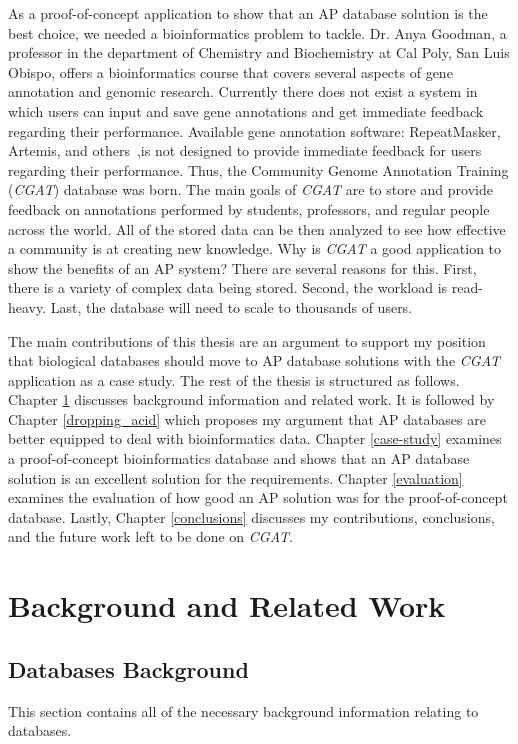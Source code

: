 \documentclass[12pt]{ucthesis}
\begin{document}
As a proof-of-concept application to show that an AP database solution is the best choice, we needed a bioinformatics problem to tackle. Dr. Anya Goodman, a professor in the department of Chemistry and Biochemistry
at Cal Poly, San Luis Obispo, offers a bioinformatics course that covers
several aspects of gene annotation and genomic research. Currently there does not exist a
system in which users can input and save gene annotations and get immediate
feedback regarding their performance. Available gene annotation
software: RepeatMasker, Artemis, and others~\cite{repeatmasker, artemis},is
not designed to provide immediate feedback for users regarding their
performance. Thus, the Community Genome Annotation Training (\textit{CGAT}) database was born. The main goals of \textit{CGAT} are to store and provide feedback on annotations performed by students, professors, and regular people across the world. All of the stored data can be then analyzed to see how effective a community is at creating new knowledge. Why is \textit{CGAT} a good application to show the benefits of an AP system? There are several reasons for this. First, there is a variety of complex data being stored. Second, the workload is read-heavy. Last, the database will need to scale to thousands of users.

The main contributions of this thesis are an argument to support my position that biological databases should move to AP database solutions with the \textit{CGAT} application as a case study. The rest of the thesis is structured as follows. Chapter \ref{previous-work} discusses background information and related work. It is followed by Chapter \ref{dropping_acid} which proposes my argument that AP databases are better equipped to deal with bioinformatics data. Chapter \ref{case-study} examines a proof-of-concept bioinformatics database and shows that an AP database solution is an excellent solution for the requirements. Chapter \ref{evaluation} examines the evaluation of how good an AP solution was for the proof-of-concept database. Lastly, Chapter \ref{conclusions} discusses my contributions, conclusions, and the future work left to be done on \textit{CGAT}.


\chapter{Background and Related Work}
\label{previous-work}

\section{Databases Background}
This section contains all of the necessary background information relating to databases.
\end{document}
